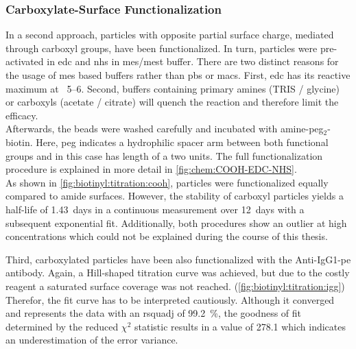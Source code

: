 \subsubsection{Carboxylate-Surface Functionalization}
In a second approach, particles with opposite partial surface charge, mediated through \gls{carboxyl} groups, have been functionalized. In turn, particles were pre-activated in \gls{edc} and \gls{nhs} in \gls{mes}/\gls{mest} buffer. There are two distinct reasons for the usage of \gls{mes} based buffers rather than \gls{pbs} or \gls{macs}. First, \gls{edc} has its reactive maximum at \pH\ \numrange{5}{6}. Second, buffers containing primary \glspl{amine} (TRIS / glycine) or \glspl{carboxyl} (acetate / citrate) will quench the reaction and therefore limit the efficacy.\\
Afterwards, the beads were washed carefully and incubated with \gls{amine}-\acrshort{peg}$_2$-biotin. Here, \gls{peg} indicates a hydrophilic spacer arm between both functional groups and in this case has length of a two units. The full functionalization procedure is explained in more detail in \cref{fig:chem:COOH-EDC-NHS}. \\
As shown in \cref{fig:biotinyl:titration:cooh}, particles were functionalized equally compared to \gls{amide} surfaces. However, the stability of \gls{carboxyl} particles yields a half-life of \SI{1.43}{days} in a continuous measurement over \SI{12}{days} with a subsequent exponential fit. Additionally, both procedures show an outlier at high concentrations which could not be explained during the course of this thesis. 

Third, \gls{carboxyl}ated particles have been also functionalized with the Anti-IgG1-\gls{pe} antibody. Again, a Hill-shaped titration curve was achieved, but due to the costly reagent a saturated surface coverage was not reached. (\cref{fig:biotinyl:titration:igg}) \\
Therefor, the fit curve has to be interpreted cautiously. Although it converged and represents the data with an \gls{rsquadj} of \SI{99.2}{\percent}, the goodness of fit determined by the reduced $\chi^2$ statistic results in a value of \num{278.1} which indicates an underestimation of the error variance.

\clearpage
